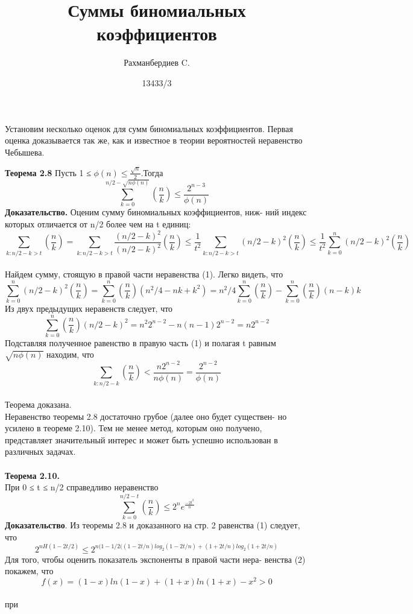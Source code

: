 \documentclass[a4paper,12pt]{article}
\title{Суммы биномиальных коэффициентов}
\author{Рахманбердиев C.}
\date{13433/3}
\begin{document}
	\maketitle
\newpage
Установим несколько оценок для сумм биномиальных коэффициентов. Первая оценка доказывается так же, как и известное в теории вероятностей
неравенство Чебышева.


\textbf{Теорема 2.8}
Пусть 1 ≤ $\phi(n) ≤ \frac{\sqrt{n}}{2}$.Тогда
$$\sum_{k=0}^{n/2-\sqrt{n\phi (n)}} (\frac{n}{k}) ≤ \frac{2^{n-3}}{\phi (n)}$$
\textbf{Доказательство.} Оценим сумму биномиальных коэффициентов, ниж-
ний индекс которых отличается от n/2
 более чем на t единиц:
 \begin{equation}
 \sum_{k:n/2 - k >t} (\frac{n}{k}) = \sum_{k:n/2-k>t} \frac{(n/2 -k)^2}{(n/2 -k)^2} (\frac{n}{k}) ≤
 \frac{1}{t^2} \sum_{k:n/2-k>t} (n/2 -k )^2  (\frac{n}{k})  ≤ \frac{1}{t^2} \sum_{k=0}^{n}(n/2 -k )^2  (\frac{n}{k})
 \end{equation}
\\ Найдем сумму, стоящую в правой части неравенства (1). Легко видеть,
 что
 $$\sum_{k=0}^{n}(n/2 -k )^2  (\frac{n}{k})=\sum_{k=0}^{n}(\frac{n}{k})(n^2/4-nk+k^2)=n^2/4\sum_{k=0}^{n}(\frac{n}{k})-\sum_{k=0}^{n}(\frac{n}{k})(n-k)k$$
 Из двух предыдущих неравенств следует, что
$$\sum_{k=0}^{n}(\frac{n}{k})(n/2 -k )^2=n^2 2^{n-2}-n(n-1)2^{n-2}=n2^{n-2}$$
Подставляя полученное равенство в правую часть (1) и полагая t равным
$\sqrt{n\phi (n)}$ находим, что
$$\sum_{k:n/2-k} (\frac{n}{k})<\frac{n2^{n-2}}{n\phi (n)}=\frac{2^{n-2}}{\phi (n)}$$
\\
Теорема доказана.\\
Неравенство теоремы 2.8 достаточно грубое (далее оно будет существен-
но усилено в теореме 2.10). Тем не менее метод, которым оно получено,
представляет значительный интерес и может быть успешно использован в
различных задачах.\\
\\
\textbf{Теорема 2.10.}\\ При 0 ≤ t ≤ n/2 справедливо неравенство
$$\sum_{k=0}^{n/2-t}(\frac{n}{k})≤2^ne^{\frac{-2t^2}{n}}$$
\textbf{Доказательство}. Из теоремы 2.8 и доказанного на стр. 2 равенства
(1) следует, что
\begin{equation}
2^{nH(1-2t/2)}≤2^{n(1-1/2((1-2t/n)log_2(1-2t/n)+(1+2t/n)log_2(1+2t/n)}
\end{equation}
Для того, чтобы оценить показатель экспоненты в правой части нера-
венства (2) покажем, что
$$f(x)=(1-x)ln(1-x)+(1+x)ln(1+x)-x^2>0$$
\\при
\end{document}
